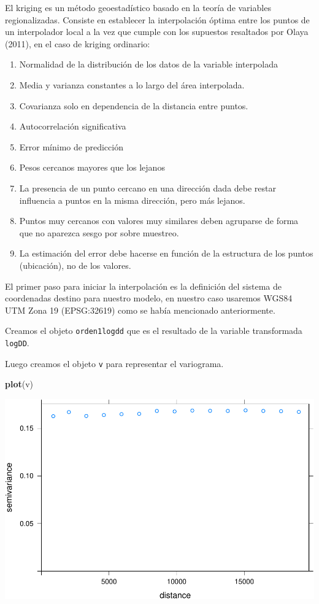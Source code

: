 \documentclass[11pt,]{article}
\newenvironment{Shaded}{\begin{snugshade}}{\end{snugshade}}
\newcommand{\KeywordTok}[1]{\textcolor[rgb]{0.13,0.29,0.53}{\textbf{#1}}}
\newcommand{\NormalTok}[1]{#1}
\providecommand{\tightlist}{%
\setlength{\itemsep}{0pt}\setlength{\parskip}{0pt}}
\begin{document}
El kriging es un método geoestadístico basado en la teoría de variables
regionalizadas. Consiste en establecer la interpolación óptima entre los
puntos de un interpolador local a la vez que cumple con los supuestos
resaltados por Olaya (2011), en el caso de kriging ordinario:

\begin{enumerate}
\def\labelenumi{\arabic{enumi}.}
\tightlist
\item
  Normalidad de la distribución de los datos de la variable interpolada
\item
  Media y varianza constantes a lo largo del área interpolada.
\item
  Covarianza solo en dependencia de la distancia entre puntos.
\item
  Autocorrelación significativa
\item
  Error mínimo de predicción
\item
  Pesos cercanos mayores que los lejanos
\item
  La presencia de un punto cercano en una dirección dada debe restar
  influencia a puntos en la misma dirección, pero más lejanos.
\item
  Puntos muy cercanos con valores muy similares deben agruparse de forma
  que no aparezca sesgo por sobre muestreo.
\item
  La estimación del error debe hacerse en función de la estructura de
  los puntos (ubicación), no de los valores.
\end{enumerate}

El primer paso para iniciar la interpolación es la definición del
sistema de coordenadas destino para nuestro modelo, en nuestro caso
usaremos WGS84 UTM Zona 19 (EPSG:32619) como se había mencionado
anteriormente.

Creamos el objeto \texttt{orden1logdd} que es el resultado de la
variable transformada \texttt{logDD}.

Luego creamos el objeto \texttt{v} para representar el variograma.

\begin{Shaded}
\begin{Highlighting}[]
\KeywordTok{plot}\NormalTok{(v)}
\end{Highlighting}
\end{Shaded}

\includegraphics{proyecto_f_files/figure-latex/unnamed-chunk-45-1.pdf}
\end{document}
